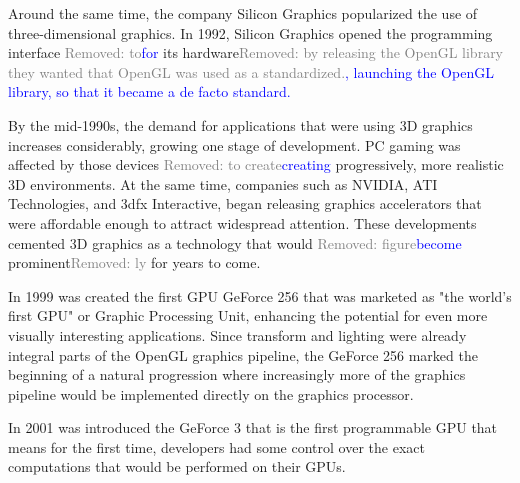 \documentclass[Ingles]{ic-tese-v1}
\newcommand{\rem}[1]{\noindent\textcolor{gray}{Removed: {#1}}}
\newcommand{\new}[1]{\noindent\textcolor{blue}{ {#1}}}
\newcommand{\rem}[1]{}
\newcommand{\new}[1]{#1}
\begin{document}
Around the same time, the company Silicon Graphics popularized the use
of three-dimensional graphics. In 1992, Silicon Graphics opened the
programming interface \rem{to}\new{for} its hardware\rem{ by releasing the OpenGL library they wanted
that OpenGL was used as a standardized.}\new{, launching the OpenGL library, so that it became a de facto standard.}

By the mid-1990s, the demand for applications that were using 3D graphics
increases considerably, growing one stage of development. PC gaming was affected
by those devices \rem{to create}\new{creating} progressively, more realistic 3D environments.
At the same time, companies such as NVIDIA, ATI Technologies,
and 3dfx Interactive, began releasing graphics accelerators that were affordable
enough to attract widespread attention. These developments cemented 3D
graphics as a technology that would \rem{figure}\new{become} prominent\rem{ly} for years to come.

In 1999 was created the first GPU GeForce 256 that was marketed as "the world's
first GPU" or Graphic Processing Unit, enhancing the potential
for even more visually interesting applications. Since transform and lighting were
already integral parts of the OpenGL graphics pipeline, the GeForce 256 marked
the beginning of a natural progression where increasingly more of the graphics
pipeline would be implemented directly on the graphics processor.

In 2001 was introduced the GeForce 3 that is the first programmable GPU that means
for the first time, developers had some control over the exact computations
that would be performed on their GPUs.
\end{document}
